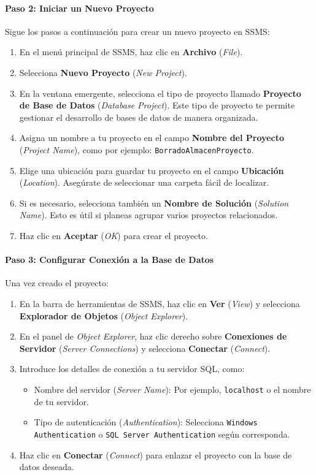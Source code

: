 \documentclass{article}
\begin{document}
\paragraph{Paso 2: Iniciar un Nuevo Proyecto}  
Sigue los pasos a continuación para crear un nuevo proyecto en SSMS:
\begin{enumerate}
	\item En el menú principal de SSMS, haz clic en \textbf{Archivo} (\textit{File}).
	\item Selecciona \textbf{Nuevo Proyecto} (\textit{New Project}).
	\item En la ventana emergente, selecciona el tipo de proyecto llamado \textbf{Proyecto de Base de Datos} (\textit{Database Project}). Este tipo de proyecto te permite gestionar el desarrollo de bases de datos de manera organizada.
	\item Asigna un nombre a tu proyecto en el campo \textbf{Nombre del Proyecto} (\textit{Project Name}), como por ejemplo: \texttt{BorradoAlmacenProyecto}.
	\item Elige una ubicación para guardar tu proyecto en el campo \textbf{Ubicación} (\textit{Location}). Asegúrate de seleccionar una carpeta fácil de localizar.
	\item Si es necesario, selecciona también un \textbf{Nombre de Solución} (\textit{Solution Name}). Esto es útil si planeas agrupar varios proyectos relacionados.
	\item Haz clic en \textbf{Aceptar} (\textit{OK}) para crear el proyecto.
\end{enumerate}

\paragraph{Paso 3: Configurar Conexión a la Base de Datos}  
Una vez creado el proyecto:
\begin{enumerate}
	\item En la barra de herramientas de SSMS, haz clic en \textbf{Ver} (\textit{View}) y selecciona \textbf{Explorador de Objetos} (\textit{Object Explorer}).
	\item En el panel de \textit{Object Explorer}, haz clic derecho sobre \textbf{Conexiones de Servidor} (\textit{Server Connections}) y selecciona \textbf{Conectar} (\textit{Connect}).
	\item Introduce los detalles de conexión a tu servidor SQL, como:
	\begin{itemize}
		\item Nombre del servidor (\textit{Server Name}): Por ejemplo, \texttt{localhost} o el nombre de tu servidor.
		\item Tipo de autenticación (\textit{Authentication}): Selecciona \texttt{Windows Authentication} o \texttt{SQL Server Authentication} según corresponda.
	\end{itemize}
	\item Haz clic en \textbf{Conectar} (\textit{Connect}) para enlazar el proyecto con la base de datos deseada.
\end{enumerate}
\end{document}
